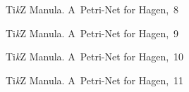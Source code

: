 \documentclass[a4paper,11pt]{article}
\begin{document}
\begin{figure}[ht]

  \centering

  \begin{tikzpicture}



  \end{tikzpicture}

  \caption{Ti\emph{k}Z Manula. A~Petri-Net for Hagen,~8}

\end{figure}





\begin{figure}[ht]

  \centering

  \begin{tikzpicture}



  \end{tikzpicture}

  \caption{Ti\emph{k}Z Manula. A~Petri-Net for Hagen,~9}

\end{figure}





\begin{figure}[ht]

  \centering

  \begin{tikzpicture}



  \end{tikzpicture}

  \caption{Ti\emph{k}Z Manula. A~Petri-Net for Hagen,~10}

\end{figure}





\begin{figure}[ht]

  \centering

  \begin{tikzpicture}



  \end{tikzpicture}

    \caption{Ti\emph{k}Z Manula. A~Petri-Net for Hagen,~11}

\end{figure}
\end{document}
